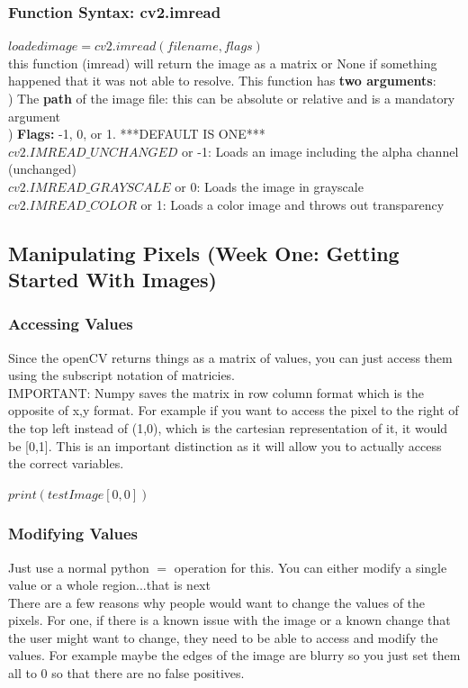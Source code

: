 \documentclass[fleqn]{article}
\begin{document}
    \subsubsection{Function Syntax: cv2.imread}
    \textbf{$loaded image = cv2.imread(filename, flags)$}\\
    \tab this function (imread) will return the image as a matrix or None if something happened that it was not able to resolve.
    \tab This function has \textbf{two arguments}:\\
    \tab {}) The \textbf{path} of the image file: this can be absolute or relative and is a mandatory argument\\
    \tab {}) \textbf{Flags:} -1, 0, or 1. ***DEFAULT IS ONE***\\
    \indent \indent $cv2.IMREAD\_UNCHANGED$ or -1: Loads an image including the alpha channel (unchanged)\\
    \indent \indent   $cv2.IMREAD\_GRAYSCALE$ or 0: Loads the image in grayscale\\
    \indent \indent  $cv2.IMREAD\_COLOR$ or 1: Loads a color image and throws out transparency\\

    \newpage
    \clearpage
    \subsection{Manipulating Pixels (Week One: Getting Started With Images)}
    \subsubsection{Accessing Values}
    \indent Since the openCV returns things as a matrix of values, you can just access them using the subscript notation of matricies.\\
    IMPORTANT: Numpy saves the matrix in row column format which is the opposite of x,y format. For example if you want to access the pixel to the right of the top left instead of (1,0), which is the cartesian representation of it, it would be [0,1]. This is an important distinction as it will allow you to actually access the correct variables.\\

    \begin{center}
      $print(testImage[0,0])$
    \end{center}


    \subsubsection{Modifying Values}
    Just use a normal python $=$ operation for this. You can either modify a single value or a whole region...that is next\\
    There are a few reasons why people would want to change the values of the pixels. For one, if there is a known issue with the image or a known change that the user might want to change, they need to be able to access and modify the values. For example maybe the edges of the image are blurry so you just set them all to 0 so that there are no false positives.
\end{document}
